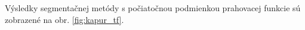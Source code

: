 \documentclass[a4paper,11pt,oneside]{article}%
\begin{document}
Výsledky segmentačnej metódy s počiatočnou podmienkou prahovacej funkcie sú zobrazené na obr. \ref{fig:kapur_tf}.

\begin{figure}[H]  
    \hspace{5px}

\end{figure}
\end{document}
